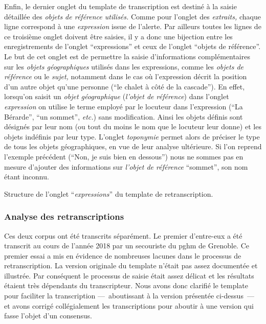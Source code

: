 Enfin, le dernier onglet du template de transcription est destiné à la
saisie détaillée des \emph{objets de référence utilisés.} Comme pour
l'onglet des \emph{extraits,} chaque ligne correspond à une
\emph{expression} issue de l'alerte. Par ailleurs toutes les lignes de
ce troisième onglet doivent être saisies, il y a donc une bijection
entre les enregistrements de l'onglet \enquote{expressions} et ceux de
l'onglet \enquote{objets de référence}. Le but de cet onglet est de
permettre la saisie d'informations complémentaires sur les
\emph{objets géographiques} utilisés dans les expressions, comme les
\emph{objets de référence} ou le \emph{sujet,} notamment dans le cas
où l'expression décrit la position d'un autre objet qu'une personne
(\eg \enquote{le chalet à côté de la cascade}). En effet, lorsqu'on
saisit un \emph{objet géographique} (\eg \emph{l'objet de référence})
dans l'onglet \emph{expression} on utilise le terme employé par le
locuteur dans l'expression (\eg \enquote{La Bérarde}, \enquote{un
  sommet}, \emph{etc.}) sans modification. Ainsi les objets définis
sont désignés par leur nom (ou tout du moins le nom que le locuteur
leur donne) et les objets indéfinis par leur type. L'onglet
\emph{toponymie} permet alors de préciser le type de tous les objets
géographiques, en vue de leur analyse ultérieure. Si l'on reprend
l'exemple précédent (\ie \enquote{Non, je suis bien en dessous}) nous
ne sommes pas en mesure d'ajouter des informations sur \emph{l'objet
  de référence} \enquote{sommet}, son nom étant inconnu.

\begin{table}
  \centering
  
  \caption{Structure de l'onglet \enquote{\emph{expressions}} du
    template de retranscription.}
  \label{tab:struct_temp}
\end{table}

\subsubsection{Analyse des retranscriptions}

Ces deux corpus ont été transcrits séparément. Le premier d'entre-eux
a été transcrit au cours de l'année 2018 par un secouriste du
\ac{pghm} de Grenoble. Ce premier essai a mis en évidence de
nombreuses lacunes dans le processus de retranscription. La version
originale du template n'était pas assez documentée et illustrée. Par
conséquent le processus de saisie était assez délicat et les résultats
étaient très dépendants du transcripteur. Nous avons donc clarifié le
template pour faciliter la transcription ---~aboutissant à la version
présentée ci-dessus~--- et avons corrigé collégialement les
transcriptions pour aboutir à une version qui fasse l'objet d'un
consensus.

